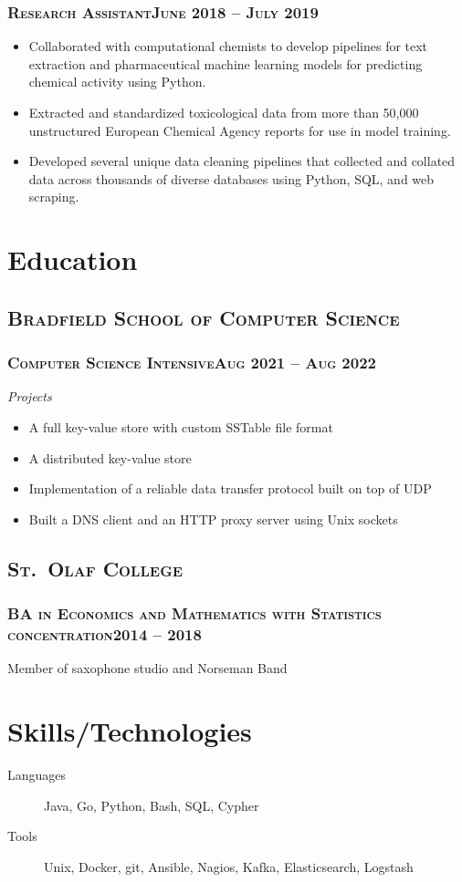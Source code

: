 \documentclass{article}
\newcommand{\resumeSection}[1]{\section*{#1}}
\newcommand{\institution}[1]{\subsection*{\scshape{#1}}}
\newcommand{\jobPosition}[3]{\subsubsection*{\scshape{#1}\hfill #2 -- #3}}
\begin{document}
    \jobPosition{Research Assistant}{June 2018}{July 2019}
    \begin{itemize}[noitemsep]
      \item
            Collaborated with computational chemists to develop
            pipelines for text extraction and pharmaceutical machine
            learning models for predicting chemical activity using Python.
      \item
            Extracted and standardized toxicological data from more
            than 50,000 unstructured European Chemical Agency reports
            for use in model training.
      \item
            Developed several unique data cleaning pipelines that
            collected and collated data across thousands of diverse
            databases using Python, SQL, and web scraping.
    \end{itemize}

\resumeSection{Education}
  \institution{Bradfield School of Computer Science}
    \jobPosition{Computer Science Intensive}{Aug 2021}{Aug 2022}
    \emph{Projects}
    \begin{itemize}[noitemsep]
      \item A full key-value store with custom SSTable file format
      \item A distributed key-value store
      \item Implementation of a reliable data transfer protocol built on top of UDP
      \item Built a DNS client and an HTTP proxy server using Unix sockets
    \end{itemize}

  \institution{St.\ Olaf College}
    \jobPosition{BA in Economics and Mathematics with Statistics concentration}{2014}{2018}
    Member of saxophone studio and Norseman Band

\resumeSection{Skills/Technologies}
  \begin{description}
          \item [Languages]
    Java,
    Go,
    Python,
    Bash,
    SQL,
    Cypher
          \item [Tools]
    Unix,
    Docker,
    git,
    Ansible,
    Nagios,
    Kafka,
    Elasticsearch,
    Logstash
  \end{description}
\end{document}
